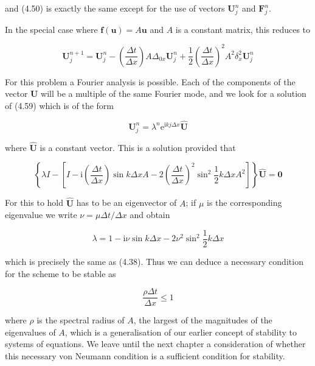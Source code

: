 \documentclass[10pt]{article}
\begin{document}
and (4.50) is exactly the same except for the use of vectors \(\mathbf{U}_{j}^{n}\) and \(\mathbf{F}_{j}^{n}\).

In the special case where \(\mathbf{f}(\mathbf{u})=A \mathbf{u}\) and \(A\) is a constant matrix, this reduces to

\[
\mathbf{U}_{j}^{n+1}=\mathbf{U}_{j}^{n}-\left(\frac{\Delta t}{\Delta x}\right) A \Delta_{0 x} \mathbf{U}_{j}^{n}+\frac{1}{2}\left(\frac{\Delta t}{\Delta x}\right)^{2} A^{2} \delta_{x}^{2} \mathbf{U}_{j}^{n}
\]

For this problem a Fourier analysis is possible. Each of the components of the vector \(\mathbf{U}\) will be a multiple of the same Fourier mode, and we look for a solution of (4.59) which is of the form

\[
\mathbf{U}_{j}^{n}=\lambda^{n} \mathrm{e}^{\mathrm{i} k j \Delta x} \widehat{\mathbf{U}}
\]

where \(\widehat{\mathbf{U}}\) is a constant vector. This is a solution provided that

\[
\left\{\lambda I-\left[I-\mathrm{i}\left(\frac{\Delta t}{\Delta x}\right) \sin k \Delta x A-2\left(\frac{\Delta t}{\Delta x}\right)^{2} \sin ^{2} \frac{1}{2} k \Delta x A^{2}\right]\right\} \widehat{\mathbf{U}}=\mathbf{0}
\]

For this to hold \(\widehat{\mathbf{U}}\) has to be an eigenvector of \(A\); if \(\mu\) is the corresponding eigenvalue we write \(\nu=\mu \Delta t / \Delta x\) and obtain

\[
\lambda=1-\mathrm{i} \nu \sin k \Delta x-2 \nu^{2} \sin ^{2} \frac{1}{2} k \Delta x
\]

which is precisely the same as (4.38). Thus we can deduce a necessary condition for the scheme to be stable as

\[
\frac{\rho \Delta t}{\Delta x} \leq 1
\]

where \(\rho\) is the spectral radius of \(A\), the largest of the magnitudes of the eigenvalues of \(A\), which is a generalisation of our earlier concept of stability to systems of equations. We leave until the next chapter a consideration of whether this necessary von Neumann condition is a sufficient condition for stability.
\end{document}
